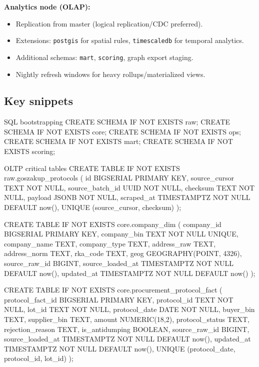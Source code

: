 \documentclass[11pt,a4paper]{article}
\begin{document}
\textbf{Analytics node (OLAP):}
\begin{itemize}[leftmargin=1.4em]
  \item Replication from master (logical replication/CDC preferred).
  \item Extensions: \texttt{postgis} for spatial rules, \texttt{timescaledb} for temporal analytics.
  \item Additional schemas: \texttt{mart}, \texttt{scoring}, graph export staging.
  \item Nightly refresh windows for heavy rollups/materialized views.
\end{itemize}

\subsection{Key snippets}
\begin{codeblock}[language=SQL]{SQL bootstrapping}
CREATE SCHEMA IF NOT EXISTS raw;
CREATE SCHEMA IF NOT EXISTS core;
CREATE SCHEMA IF NOT EXISTS ops;
CREATE SCHEMA IF NOT EXISTS mart;
CREATE SCHEMA IF NOT EXISTS scoring;
\end{codeblock}

\begin{codeblock}[language=SQL]{OLTP critical tables}
CREATE TABLE IF NOT EXISTS raw.goszakup_protocols (
    id BIGSERIAL PRIMARY KEY,
    source_cursor TEXT NOT NULL,
    source_batch_id UUID NOT NULL,
    checksum TEXT NOT NULL,
    payload JSONB NOT NULL,
    scraped_at TIMESTAMPTZ NOT NULL DEFAULT now(),
    UNIQUE (source_cursor, checksum)
);

CREATE TABLE IF NOT EXISTS core.company_dim (
    company_id BIGSERIAL PRIMARY KEY,
    company_bin TEXT NOT NULL UNIQUE,
    company_name TEXT,
    company_type TEXT,
    address_raw TEXT,
    address_norm TEXT,
    rka_code TEXT,
    geog GEOGRAPHY(POINT, 4326),
    source_raw_id BIGINT,
    source_loaded_at TIMESTAMPTZ NOT NULL DEFAULT now(),
    updated_at TIMESTAMPTZ NOT NULL DEFAULT now()
);

CREATE TABLE IF NOT EXISTS core.procurement_protocol_fact (
    protocol_fact_id BIGSERIAL PRIMARY KEY,
    protocol_id TEXT NOT NULL,
    lot_id TEXT NOT NULL,
    protocol_date DATE NOT NULL,
    buyer_bin TEXT,
    supplier_bin TEXT,
    amount NUMERIC(18,2),
    protocol_status TEXT,
    rejection_reason TEXT,
    is_antidumping BOOLEAN,
    source_raw_id BIGINT,
    source_loaded_at TIMESTAMPTZ NOT NULL DEFAULT now(),
    updated_at TIMESTAMPTZ NOT NULL DEFAULT now(),
    UNIQUE (protocol_date, protocol_id, lot_id)
);
\end{codeblock}
\end{document}
